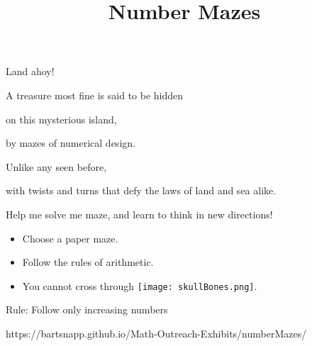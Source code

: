 \documentclass{../exhibit}
\title{Number Mazes}
\begin{document}
\begin{context}

Land ahoy!

A treasure most fine is said to be hidden


on this mysterious island, 


by mazes of numerical design.



Unlike any seen before,


with twists and turns that defy the laws of land and sea alike.



Help me solve me maze, and learn to think in new directions!
\end{context}

\begin{directions}
  \begin{itemize}
    \item Choose a paper maze.
    \item Follow the rules of arithmetic.
    \item You cannot cross through \texttt{[image: skullBones.png]}.
\end{itemize}
\end{directions}

\begin{example}
  \begin{center}
    Rule: Follow only increasing numbers
\end{center}
\end{example}

\begin{mathConnections}
  https://bartsnapp.github.io/Math-Outreach-Exhibits/numberMazes/
\end{mathConnections}
\end{document}
